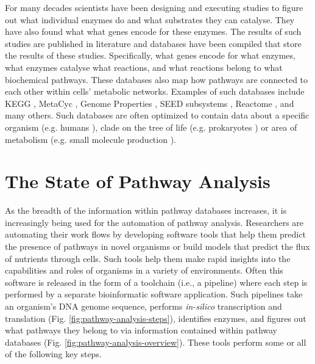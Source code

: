 For many decades scientists have been designing and executing studies to figure out what individual enzymes do and what substrates they can catalyse. They have also found what what genes encode for these enzymes. The results of such studies are published in literature and databases have been compiled that store the results of these studies. Specifically, what genes encode for what enzymes, what enzymes catalyse what reactions, and what reactions belong to what biochemical pathways. These databases also map how pathways are connected to each other within cells' metabolic networks. Examples of such databases include KEGG \cite{kanehisa2000kegg}, MetaCyc \cite{karp2002metacyc}, Genome Properties \cite{richardson2018genome}, SEED subsystems \cite{overbeek2005subsystems}, Reactome \cite{croft2013reactome}, and many others. Such databases are often optimized to contain data about a specific organism (e.g. humans \cite{croft2013reactome}), clade on the tree of life (e.g. prokaryotes \cite{richardson2018genome}) or area of metabolism (e.g. small molecule production \cite{Jewison2014}).

\section{The State of Pathway Analysis}

As the breadth of the information within pathway databases increases, it is increasingly being used for the automation of pathway analysis. Researchers are automating their work flows by developing software tools that help them predict the presence of pathways in novel organisms or build models that predict the flux of nutrients through cells. Such tools help them make rapid insights into the capabilities and roles of organisms in a variety of environments. Often this software is released in the form of a toolchain (i.e., a pipeline) where each step is performed by a separate bioinformatic software application. Such pipelines take an organism's DNA genome sequence, performs \textit{in-silico} transcription and translation (Fig. \ref{fig:pathway-analysis-steps}), identifies enzymes, and figures out what pathways they belong to via information contained within pathway databases (Fig. \ref{fig:pathway-analysis-overview}). These tools perform some or all of the following key steps.

